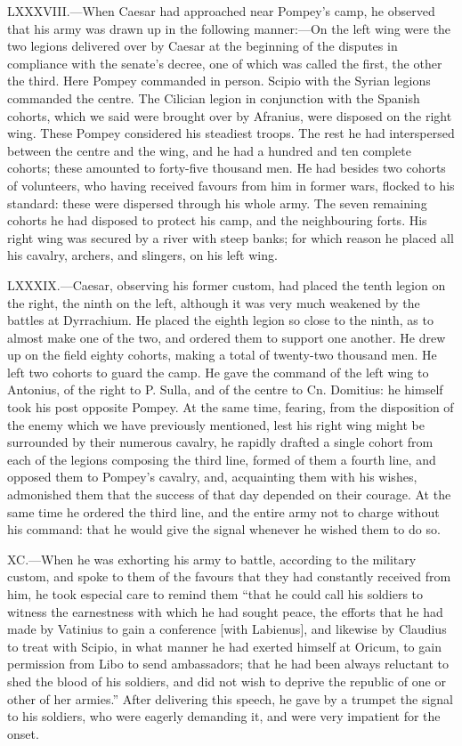LXXXVIII.—When Caesar had approached near Pompey's camp, he observed
that his army was drawn up in the following manner:—On the left wing
were the two legions delivered over by Caesar at the beginning of the
disputes in compliance with the senate's decree, one of which was called
the first, the other the third. Here Pompey commanded in person. Scipio
with the Syrian legions commanded the centre. The Cilician legion in
conjunction with the Spanish cohorts, which we said were brought over by
Afranius, were disposed on the right wing. These Pompey considered his
steadiest troops. The rest he had interspersed between the centre and
the wing, and he had a hundred and ten complete cohorts; these amounted
to forty-five thousand men. He had besides two cohorts of volunteers,
who having received favours from him in former wars, flocked to his
standard: these were dispersed through his whole army. The seven
remaining cohorts he had disposed to protect his camp, and the
neighbouring forts. His right wing was secured by a river with steep
banks; for which reason he placed all his cavalry, archers, and
slingers, on his left wing.

LXXXIX.—Caesar, observing his former custom, had placed the tenth
legion on the right, the ninth on the left, although it was very much
weakened by the battles at Dyrrachium. He placed the eighth legion so
close to the ninth, as to almost make one of the two, and ordered them
to support one another. He drew up on the field eighty cohorts, making a
total of twenty-two thousand men. He left two cohorts to guard the camp.
He gave the command of the left wing to Antonius, of the right to P.
Sulla, and of the centre to Cn. Domitius: he himself took his post
opposite Pompey. At the same time, fearing, from the disposition of the
enemy which we have previously mentioned, lest his right wing might be
surrounded by their numerous cavalry, he rapidly drafted a single cohort
from each of the legions composing the third line, formed of them a
fourth line, and opposed them to Pompey's cavalry, and, acquainting them
with his wishes, admonished them that the success of that day depended
on their courage. At the same time he ordered the third line, and the
entire army not to charge without his command: that he would give the
signal whenever he wished them to do so.

XC.—When he was exhorting his army to battle, according to the military
custom, and spoke to them of the favours that they had constantly
received from him, he took especial care to remind them ``that he could
call his soldiers to witness the earnestness with which he had sought
peace, the efforts that he had made by Vatinius to gain a conference
[with Labienus], and likewise by Claudius to treat with Scipio, in what
manner he had exerted himself at Oricum, to gain permission from Libo to
send ambassadors; that he had been always reluctant to shed the blood of
his soldiers, and did not wish to deprive the republic of one or other
of her armies.'' After delivering this speech, he gave by a trumpet the
signal to his soldiers, who were eagerly demanding it, and were very
impatient for the onset.

